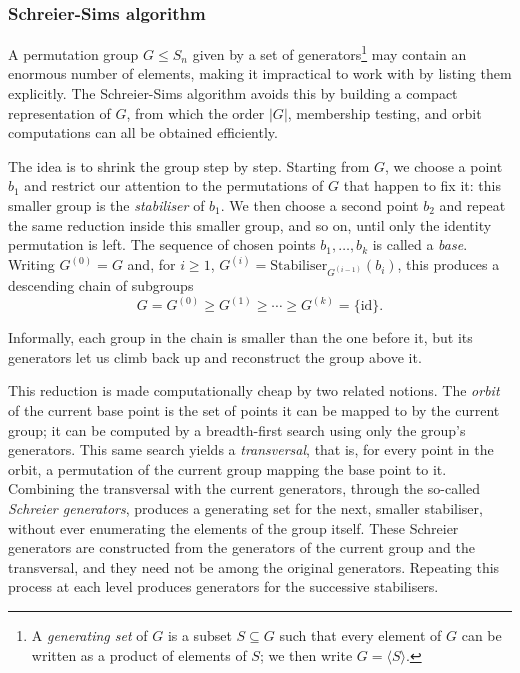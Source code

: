 \subsubsection{Schreier-Sims algorithm}

A permutation group $G \leq S_n$ given by a set of generators\footnote{A \emph{generating set} of $G$ is a subset
$S \subseteq G$ such that every element of $G$ can be written as a
product of elements of $S$; we then write $G = \langle S \rangle$.} may contain an enormous number of elements, making it impractical to work with by listing them explicitly. The Schreier-Sims algorithm avoids this by building a compact representation of $G$, from
which the order $|G|$, membership testing, and orbit computations can all
be obtained efficiently.

The idea is to shrink the group step by step. Starting from $G$, we choose
a point $b_1$ and restrict our attention to the permutations of $G$ that
happen to fix it: this smaller group is the \emph{stabiliser} of $b_1$. We
then choose a second point $b_2$ and repeat the same reduction inside this
smaller group, and so on, until only the identity permutation is left. The
sequence of chosen points $b_1, \dots, b_k$ is called a \emph{base}. 
Writing $G^{(0)} = G$ and, for $i \geq 1$,
$G^{(i)} = \mathrm{Stabiliser}_{G^{(i-1)}}(b_i)$, this produces a descending
chain of subgroups
\[
G = G^{(0)} \geq G^{(1)} \geq \cdots \geq G^{(k)} = \{\mathrm{id}\}.
\]

Informally, each group in the chain is smaller than the one before it,
but its generators let us climb back up and reconstruct the group above
it. 

This reduction is made computationally cheap by two related notions. The
\emph{orbit} of the current base point is the set of points it can be
mapped to by the current group; it can be computed by a breadth-first
search using only the group's generators. This same search yields a
\emph{transversal}, that is, for every point in the orbit, a permutation
of the current group mapping the base point to it. Combining the transversal
with the current generators, through the so-called \emph{Schreier
generators}, produces a generating set for the next, smaller stabiliser, without ever enumerating the elements of the group
itself. These Schreier generators are constructed from the generators of the
current group and the transversal, and they need not be among the original
generators. Repeating this process at each level produces generators for the
successive stabilisers.

